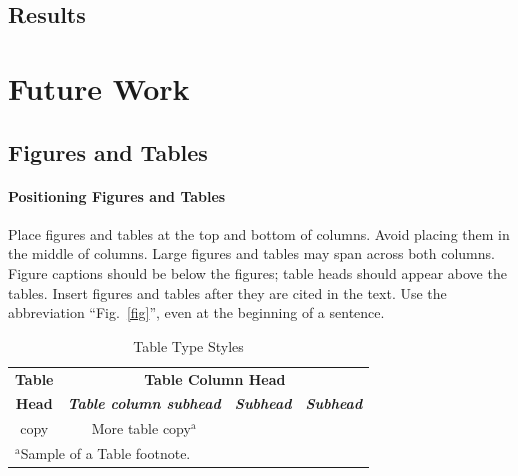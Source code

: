\documentclass[conference]{IEEEtran}
\begin{document}
\subsection{Results}

\section{Future Work}


\subsection{Figures and Tables}
\paragraph{Positioning Figures and Tables} Place figures and tables at the top and 
bottom of columns. Avoid placing them in the middle of columns. Large 
figures and tables may span across both columns. Figure captions should be 
below the figures; table heads should appear above the tables. Insert 
figures and tables after they are cited in the text. Use the abbreviation 
``Fig.~\ref{fig}'', even at the beginning of a sentence.

\begin{table}[htbp]
\caption{Table Type Styles}
\begin{center}
\begin{tabular}{|c|c|c|c|}
\hline
\textbf{Table}&\multicolumn{3}{|c|}{\textbf{Table Column Head}} \\
\cline{2-4} 
\textbf{Head} & \textbf{\textit{Table column subhead}}& \textbf{\textit{Subhead}}& \textbf{\textit{Subhead}} \\
\hline
copy& More table copy$^{\mathrm{a}}$& &  \\
\hline
\multicolumn{4}{l}{$^{\mathrm{a}}$Sample of a Table footnote.}
\end{tabular}
\label{tab1}
\end{center}
\end{table}
\end{document}
